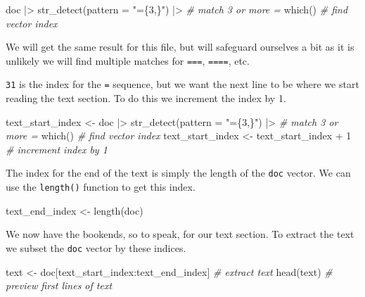 \documentclass[
  letterpaper,
  DIV=11,
  numbers=noendperiod]{scrreport}
\newenvironment{Shaded}{\begin{snugshade}}{\end{snugshade}}
\newcommand{\AttributeTok}[1]{\textcolor[rgb]{0.00,0.00,0.00}{#1}}
\newcommand{\CommentTok}[1]{\textcolor[rgb]{0.00,0.00,0.00}{\textit{#1}}}
\newcommand{\DecValTok}[1]{\textcolor[rgb]{0.00,0.00,0.00}{#1}}
\newcommand{\FunctionTok}[1]{\textcolor[rgb]{0.00,0.00,0.00}{#1}}
\newcommand{\NormalTok}[1]{\textcolor[rgb]{0.00,0.00,0.00}{#1}}
\newcommand{\OtherTok}[1]{\textcolor[rgb]{0.00,0.00,0.00}{#1}}
\newcommand{\SpecialCharTok}[1]{\textcolor[rgb]{0.00,0.00,0.00}{#1}}
\newcommand{\StringTok}[1]{\textcolor[rgb]{0.00,0.00,0.00}{#1}}
\theoremstyle{definition}
\theoremstyle{remark}
\begin{document}
\begin{Shaded}
\begin{Highlighting}[]
\NormalTok{doc }\SpecialCharTok{|\textgreater{}}
  \FunctionTok{str\_detect}\NormalTok{(}\AttributeTok{pattern =} \StringTok{"=\{3,\}"}\NormalTok{) }\SpecialCharTok{|\textgreater{}} \CommentTok{\# match 3 or more \textasciigrave{}=\textasciigrave{}}
  \FunctionTok{which}\NormalTok{() }\CommentTok{\# find vector index}
\end{Highlighting}
\end{Shaded}

We will get the same result for this file, but will safeguard ourselves
a bit as it is unlikely we will find multiple matches for \texttt{===},
\texttt{====}, etc.

\texttt{31} is the index for the \texttt{=} sequence, but we want the
next line to be where we start reading the text section. To do this we
increment the index by 1.

\begin{Shaded}
\begin{Highlighting}[]
\NormalTok{text\_start\_index }\OtherTok{\textless{}{-}}
\NormalTok{  doc }\SpecialCharTok{|\textgreater{}}
  \FunctionTok{str\_detect}\NormalTok{(}\AttributeTok{pattern =} \StringTok{"=\{3,\}"}\NormalTok{) }\SpecialCharTok{|\textgreater{}} \CommentTok{\# match 3 or more \textasciigrave{}=\textasciigrave{}}
  \FunctionTok{which}\NormalTok{() }\CommentTok{\# find vector index}
\NormalTok{text\_start\_index }\OtherTok{\textless{}{-}}\NormalTok{ text\_start\_index }\SpecialCharTok{+} \DecValTok{1} \CommentTok{\# increment index by 1}
\end{Highlighting}
\end{Shaded}

The index for the end of the text is simply the length of the
\texttt{doc} vector. We can use the \texttt{length()} function to get
this index.

\begin{Shaded}
\begin{Highlighting}[]
\NormalTok{text\_end\_index }\OtherTok{\textless{}{-}} \FunctionTok{length}\NormalTok{(doc)}
\end{Highlighting}
\end{Shaded}

We now have the bookends, so to speak, for our text section. To extract
the text we subset the \texttt{doc} vector by these indices.

\begin{Shaded}
\begin{Highlighting}[]
\NormalTok{text }\OtherTok{\textless{}{-}}\NormalTok{ doc[text\_start\_index}\SpecialCharTok{:}\NormalTok{text\_end\_index] }\CommentTok{\# extract text}
\FunctionTok{head}\NormalTok{(text) }\CommentTok{\# preview first lines of \textasciigrave{}text\textasciigrave{}}
\end{Highlighting}
\end{Shaded}
\end{document}
